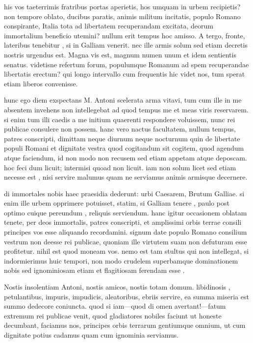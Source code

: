  his vos taeterrimis fratribus portas aperietis, hos umquam in urbem recipietis? non tempore oblato, ducibus paratis, animis militum incitatis, populo Romano conspirante, Italia tota ad libertatem recuperandam excitata, deorum immortalium beneficio utemini? nullum erit tempus hoc amisso. A tergo, fronte, lateribus tenebitur , si in Galliam venerit. nec ille armis solum sed etiam decretis nostris urgendus est. Magna vis est, magnum numen unum et idem sentientis senatus. videtisne refertum forum, populumque Romanum ad spem recuperandae libertatis erectum? qui longo intervallo cum frequentis hic videt nos, tum sperat etiam liberos convenisse.

 hunc ego diem exspectans M. Antoni scelerata arma vitavi, tum cum ille in me absentem invehens non intellegebat ad quod tempus me et meas viris reservarem. si enim tum illi caedis a me initium quaerenti respondere voluissem, nunc rei publicae consulere non possem. hanc vero nactus facultatem, nullum tempus, patres conscripti, dimittam neque diurnum neque nocturnum quin de libertate populi Romani et dignitate vestra quod cogitandum sit cogitem, quod agendum atque faciendum, id non modo non recusem sed etiam appetam atque deposcam. hoc feci dum licuit; intermisi quoad non licuit. iam non solum licet sed etiam necesse est , nisi servire malumus quam ne serviamus animis armisque decernere.

 di immortales nobis haec praesidia dederunt: urbi Caesarem, Brutum Galliae. si enim ille urbem opprimere potuisset, statim, si Galliam tenere , paulo post optimo cuique pereundum , reliquis serviendum. hanc igitur occasionem oblatam tenete, per deos immortalis, patres conscripti, et amplissimi orbis terrae consili principes vos esse aliquando recordamini. signum date populo Romano consilium vestrum non deesse rei publicae, quoniam ille virtutem suam non defuturam esse profitetur. nihil est quod moneam vos. nemo est tam stultus qui non intellegat, si indormierimus huic tempori, non modo crudelem superbamque dominationem nobis sed ignominiosam etiam et flagitiosam ferendam esse .

 Nostis insolentiam Antoni, nostis amicos, nostis totam domum. libidinosis , petulantibus, impuris, impudicis, aleatoribus, ebriis servire, ea summa miseria est summo dedecore coniuncta. quod si iam—quod di omen avertant!—fatum extremum rei publicae venit, quod gladiatores nobiles faciunt ut honeste decumbant, faciamus nos, principes orbis terrarum gentiumque omnium, ut cum dignitate potius cadamus quam cum ignominia serviamus.

